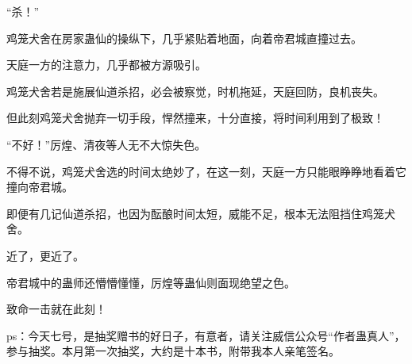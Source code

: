 \begin{this_body}
“杀！”

鸡笼犬舍在房家蛊仙的操纵下，几乎紧贴着地面，向着帝君城直撞过去。

天庭一方的注意力，几乎都被方源吸引。

鸡笼犬舍若是施展仙道杀招，必会被察觉，时机拖延，天庭回防，良机丧失。

但此刻鸡笼犬舍抛弃一切手段，悍然撞来，十分直接，将时间利用到了极致！

“不好！”厉煌、清夜等人无不大惊失色。

不得不说，鸡笼犬舍选的时间太绝妙了，在这一刻，天庭一方只能眼睁睁地看着它撞向帝君城。

即便有几记仙道杀招，也因为酝酿时间太短，威能不足，根本无法阻挡住鸡笼犬舍。

近了，更近了。

帝君城中的蛊师还懵懵懂懂，厉煌等蛊仙则面现绝望之色。

致命一击就在此刻！

ps：今天七号，是抽奖赠书的好日子，有意者，请关注威信公众号“作者蛊真人”，参与抽奖。本月第一次抽奖，大约是十本书，附带我本人亲笔签名。

\end{this_body}

